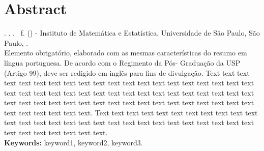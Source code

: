\chapter*{Abstract}
\noindent \citacaoautor. \textbf{\titulotrabalhoingles}. 
\ano. \paginas~f.
\tipotrabalho (\tipoprograma) - Instituto de Matemática e Estatística,
Universidade de São Paulo, São Paulo, \ano.
\\


Elemento obrigatório, elaborado com as mesmas características do resumo em
língua portuguesa. De acordo com o Regimento da Pós- Graduação da USP (Artigo
99), deve ser redigido em inglês para fins de divulgação. 
Text text text text text text text text text text text text text text text text
text text text text text text text text text text text text text text text text
text text text text text text text text text text text text text text text text
text text text text text text text text text text text text.
Text text text text text text text text text text text text text text text text
text text text text text text text text text text text text text text text text
text text text.
\\

\noindent \textbf{Keywords:} keyword1, keyword2, keyword3.

